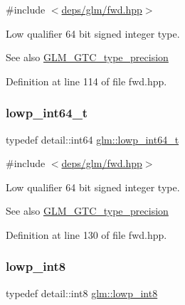 {\ttfamily \#include $<$\hyperlink{fwd_8hpp}{deps/glm/fwd.\+hpp}$>$}

Low qualifier 64 bit signed integer type. \begin{DoxySeeAlso}{See also}
\hyperlink{group__gtc__type__precision}{G\+L\+M\+\_\+\+G\+T\+C\+\_\+type\+\_\+precision} 
\end{DoxySeeAlso}


Definition at line 114 of file fwd.\+hpp.

\mbox{\label{group__gtc__type__precision_ga14d72e76d57c7f28eca8e933816c9fd6}} 
\subsubsection{\texorpdfstring{lowp\+\_\+int64\+\_\+t}{lowp\_int64\_t}}
{\footnotesize\ttfamily typedef detail\+::int64 \hyperlink{group__gtc__type__precision_ga14d72e76d57c7f28eca8e933816c9fd6}{glm\+::lowp\+\_\+int64\+\_\+t}}



{\ttfamily \#include $<$\hyperlink{fwd_8hpp}{deps/glm/fwd.\+hpp}$>$}

Low qualifier 64 bit signed integer type. \begin{DoxySeeAlso}{See also}
\hyperlink{group__gtc__type__precision}{G\+L\+M\+\_\+\+G\+T\+C\+\_\+type\+\_\+precision} 
\end{DoxySeeAlso}


Definition at line 130 of file fwd.\+hpp.

\mbox{\label{group__gtc__type__precision_gaf9e675b6392764242ae87eb179e9d3d6}} 
\subsubsection{\texorpdfstring{lowp\+\_\+int8}{lowp\_int8}}
{\footnotesize\ttfamily typedef detail\+::int8 \hyperlink{group__gtc__type__precision_gaf9e675b6392764242ae87eb179e9d3d6}{glm\+::lowp\+\_\+int8}}



